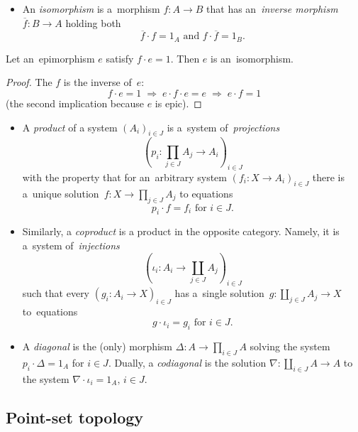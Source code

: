 \begin{itemize}
\item An \emph{isomorphism} is a~morphism $f\colon A \to B$ that has
an~\emph{inverse morphism\/} $\overline{f}\colon B \to A$ holding both
\[
  \overline{f} \cdot f = 1_A \text{ and } f \cdot \overline{f} = 1_B.
\]
\end{itemize}

\begin{lem} \label{lem:epi->iso}
  Let an~epimorphism $e$ satisfy $f \cdot e = 1$.
  Then $e$ is an~isomorphism.
\end{lem}
\begin{proof}
  The $f$ is the inverse of~$e$:
  \[
    f \cdot e = 1 \; \Rightarrow \; e \cdot f \cdot e = e \; \Rightarrow \; e
    \cdot f = 1
  \]
  (the second implication because $e$ is epic).
\end{proof}

\begin{itemize}
\item A \emph{product} of a system $\left(A_i\right)_{i\in J}$ is a~system
of~\emph{projections\/}
\[
  \left(p_i\colon \prod_{j\in J} A_j \to A_i \right)_{i\in J}
\]
with the property that for an~arbitrary system $\left(f_i\colon X \to
A_i\right)_{i\in J}$ there is a~unique solution~$f\colon X \to \prod_{j\in
J} A_j$ to equations
\[
  p_i \cdot f = f_i \text{ for } i\in J.
\]

\item Similarly, a \emph{coproduct} is a product in the opposite category.
Namely, it is a~system of~\emph{injections\/}
\[
  \left(\iota_i\colon A_i \to \coprod_{j\in J} A_j \right)_{i\in J}
\]
such that every $\left(g_i\colon A_i \to X \right)_{i\in J}$ has a~single
solution~$g\colon \coprod_{j\in J} A_j \to X$ to~equations
\[
  g \cdot \iota_i = g_i \text{ for } i\in J.
\]

\item A \emph{diagonal} is the (only) morphism $\Delta\colon A \to \prod_{i\in
J} A$ solving the system $p_i\cdot \Delta = 1_A$ for $i \in J$.
Dually, a \emph{codiagonal} is the solution $\nabla\colon \coprod_{i\in J} A
\to A$ to the system $\nabla\cdot \iota_i = 1_A, \, i \in J$.
\end{itemize}


\subsection*{Point-set topology}

